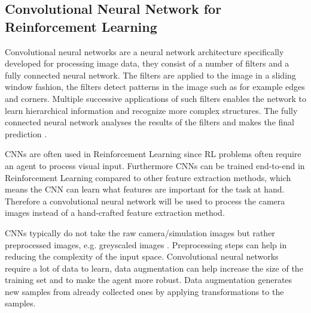 

\subsection*{Convolutional Neural Network for Reinforcement Learning}

Convolutional neural networks are a neural network architecture specifically developed for processing image data, they consist of a number of filters and a fully connected neural network. The filters are applied to the image in a sliding window fashion, the filters detect patterns in the image such as for example edges and corners. Multiple successive applications of such filters enables the network to learn hierarchical information and recognize more complex structures. The fully connected neural network analyses the results of the filters and makes the final prediction \autocite{rlbook2020}.

CNNs are often used in Reinforcement Learning since RL problems often require an agent to process visual input. Furthermore CNNs can be trained end-to-end in Reinforcement Learning compared to other feature extraction methods, which means the CNN can learn what features are important for the task at hand.
Therefore a convolutional neural network will be used to process the camera images instead of a hand-crafted feature extraction method. 

CNNs typically do not take the raw camera/simulation images but rather preprocessed images, e.g. greyscaled images \autocite{atari}. Preprocessing steps can help in reducing the complexity of the input space. Convolutional neural networks require a lot of data to learn, data augmentation can help increase the size of the training set and to make the agent more robust. Data augmentation generates new samples from already collected ones by applying transformations to the samples. 


